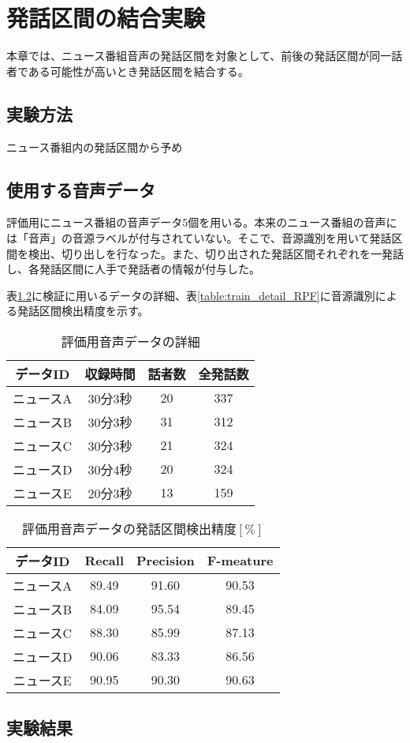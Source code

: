 \chapter{発話区間の結合実験}
本章では、ニュース番組音声の発話区間を対象として、前後の発話区間が同一話者である可能性が高いとき発話区間を結合する。
\section{実験方法}
ニュース番組内の発話区間から予め
\section{使用する音声データ}
\par
評価用にニュース番組の音声データ5個を用いる。本来のニュース番組の音声には「音声」の音源ラベルが付与されていない。そこで、音源識別を用いて発話区間を検出、切り出しを行なった。また、切り出された発話区間それぞれを一発話し、各発話区間に人手で発話者の情報が付与した。\par
表\ref{table:test_detail}に検証に用いるデータの詳細、表\ref{table:train_detail_RPF}に音源識別による発話区間検出精度を示す。

\begin{table}[htb]
  \begin{center}
  \label{table:test_detail}
    \caption{評価用音声データの詳細}
    \begin{tabular}{|c||c|c|c|} \hline
      データID & 収録時間 & 話者数 & 全発話数 \\ \hline
      ニュースA & 30分3秒 & 20 & 337 \\ \hline
      ニュースB & 30分3秒 & 31 & 312\\ \hline
      ニュースC & 30分3秒 & 21 & 324 \\ \hline
      ニュースD & 30分4秒 & 20 & 324\\ \hline
      ニュースE & 20分3秒 & 13 & 159\\ \hline
    \end{tabular}
  \end{center}
\end{table}

\begin{table}[htb]
  \begin{center}
  \label{table:test_detail}
    \caption{評価用音声データの発話区間検出精度$[\%]$}
    \begin{tabular}{|c||c|c|c|} \hline
      データID & Recall & Precision & F-meature \\ \hline
      ニュースA & 89.49 & 91.60 & 90.53 \\ \hline
      ニュースB & 84.09 & 95.54 & 89.45\\ \hline
      ニュースC & 88.30 & 85.99 & 87.13 \\ \hline
      ニュースD & 90.06 & 83.33 & 86.56\\ \hline
      ニュースE & 90.95 & 90.30 & 90.63\\ \hline
    \end{tabular}
  \end{center}
\end{table}


\section{実験結果}
